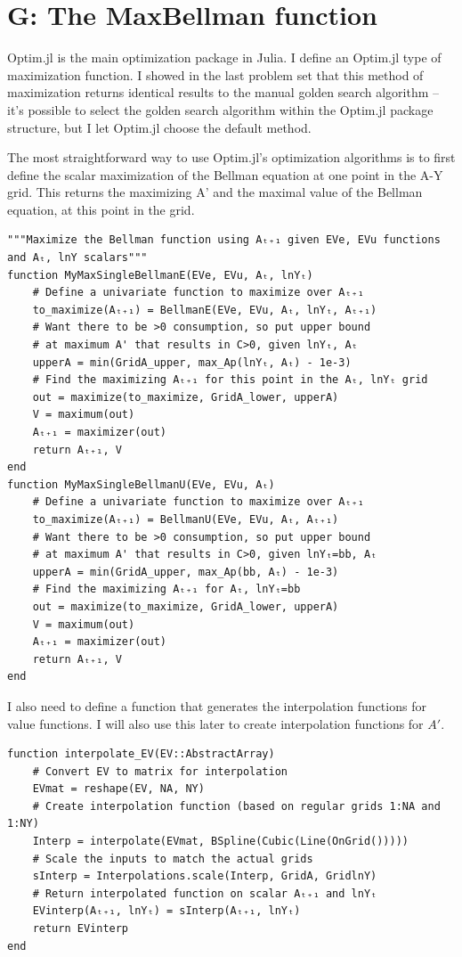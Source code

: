 \documentclass[12pt]{article}
\begin{document}
\section*{G: The MaxBellman function}
Optim.jl is the main optimization package in Julia. I define an Optim.jl type of maximization function. I showed in the last problem set that this method of maximization returns identical results to the manual golden search algorithm -- it's possible to select the golden search algorithm within the Optim.jl package structure, but I let Optim.jl choose the default method.

The most straightforward way to use Optim.jl's optimization algorithms is to first define the scalar maximization of the Bellman equation at one point in the A-Y grid. This returns the maximizing A' and the maximal value of the Bellman equation, at this point in the grid. 
\begin{lstlisting}[language=JuliaLocal, style=julia]
"""Maximize the Bellman function using Aₜ₊₁ given EVe, EVu functions and Aₜ, lnY scalars"""
function MyMaxSingleBellmanE(EVe, EVu, Aₜ, lnYₜ)
    # Define a univariate function to maximize over Aₜ₊₁
    to_maximize(Aₜ₊₁) = BellmanE(EVe, EVu, Aₜ, lnYₜ, Aₜ₊₁)
    # Want there to be >0 consumption, so put upper bound
    # at maximum A' that results in C>0, given lnYₜ, Aₜ
    upperA = min(GridA_upper, max_Ap(lnYₜ, Aₜ) - 1e-3)
    # Find the maximizing Aₜ₊₁ for this point in the Aₜ, lnYₜ grid
    out = maximize(to_maximize, GridA_lower, upperA)
    V = maximum(out)
    Aₜ₊₁ = maximizer(out)
    return Aₜ₊₁, V
end
function MyMaxSingleBellmanU(EVe, EVu, Aₜ)
    # Define a univariate function to maximize over Aₜ₊₁
    to_maximize(Aₜ₊₁) = BellmanU(EVe, EVu, Aₜ, Aₜ₊₁)
    # Want there to be >0 consumption, so put upper bound
    # at maximum A' that results in C>0, given lnYₜ=bb, Aₜ
    upperA = min(GridA_upper, max_Ap(bb, Aₜ) - 1e-3)
    # Find the maximizing Aₜ₊₁ for Aₜ, lnYₜ=bb
    out = maximize(to_maximize, GridA_lower, upperA)
    V = maximum(out)
    Aₜ₊₁ = maximizer(out)
    return Aₜ₊₁, V
end
\end{lstlisting}

I also need to define a function that generates the interpolation functions for value functions. I will also use this later to create interpolation functions for $A'$.
\begin{lstlisting}[language=JuliaLocal, style=julia]
function interpolate_EV(EV::AbstractArray)
    # Convert EV to matrix for interpolation
    EVmat = reshape(EV, NA, NY)
    # Create interpolation function (based on regular grids 1:NA and 1:NY)
    Interp = interpolate(EVmat, BSpline(Cubic(Line(OnGrid()))))
    # Scale the inputs to match the actual grids
    sInterp = Interpolations.scale(Interp, GridA, GridlnY)
    # Return interpolated function on scalar Aₜ₊₁ and lnYₜ
    EVinterp(Aₜ₊₁, lnYₜ) = sInterp(Aₜ₊₁, lnYₜ)
    return EVinterp
end
\end{lstlisting}
\end{document}
